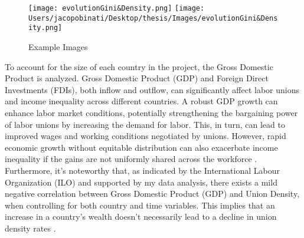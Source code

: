 \documentclass{article}
\begin{document}
\begin{figure}[htbp]
    \centering
    \texttt{[image: evolutionGini\&Density.png]}
    \texttt{[image: Users/jacopobinati/Desktop/thesis/Images/evolutionGini\&Density.png]}
    \caption{Example Images}
    \label{fig:example}
\end{figure}


To account for the size of each country in the project, the Gross Domestic Product is analyzed. Gross Domestic Product (GDP) and Foreign Direct Investments (FDIs), both inflow and outflow, can significantly affect labor unions and income inequality across different countries. A robust GDP growth can enhance labor market conditions, potentially strengthening the bargaining power of labor unions by increasing the demand for labor. This, in turn, can lead to improved wages and working conditions negotiated by unions. However, rapid economic growth without equitable distribution can also exacerbate income inequality if the gains are not uniformly shared across the workforce \cite{AddisonHirsch1989}. Furthermore, it's noteworthy that, as indicated by the International Labour Organization (ILO) and supported by my data analysis, there exists a mild negative correlation between Gross Domestic Product (GDP) and Union Density, when controlling for both country and time variables. This implies that an increase in a country's wealth doesn't necessarily lead to a decline in union density rates \cite{JelleVisser2019}.
\end{document}
